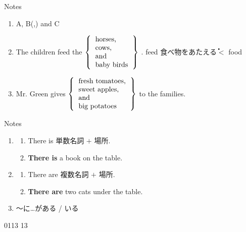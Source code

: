 \documentclass[aspectratio=169,xcolor={dvipsnames,table}]{beamer}
\newcommand{\myaudio}[1]{\href{#1}{\faVolumeUp}}
\begin{document}
\begin{frame}[plain,t]{Notes}
  \hypertarget{ABandC}{}
  \begin{enumerate}[<+->]
    \setlength{\itemsep}{5pt}
    \item A, B(,) and C
    \item The children feed the $\left\{
            \begin{tabular}{l}
              horses,    \\
              cows,      \\
              and        \\
              baby birds \\
            \end{tabular}\right\}$ .%
          \hfill{\scriptsize feed  食べ物をあたえる\.\.$<$ food}
    \item Mr. Green gives $\left\{
            \begin{tabular}{l}
              fresh tomatoes, \\
              sweet apples,   \\
              and             \\
              big potatoes    \\
            \end{tabular}\right\}$ to the families.\\
          \hfill{}
  \end{enumerate}

  \hfill\hyperlink{READING}{}

  \vspace{-90pt}

  \hspace{130pt}%
  \hspace{70pt}
\end{frame}
\begin{frame}[plain]{Notes}
  \hypertarget{THEREIS}{}
  \begin{enumerate}[<+->]
    \item \begin{enumerate}
            \item  There is 単数名詞 $+$ 場所.
            \item \textbf{There is} a book on the table.
          \end{enumerate}
    \item \begin{enumerate}
            \item There are 複数名詞 $+$ 場所.
            \item \textbf{There are} two cats under the table.
          \end{enumerate}
    \item ～に\ldots{}がある / いる
  \end{enumerate}

  \mbox{}\hfill{\tiny 0113}\,{\scriptsize \myaudio{./audio/005_singular_plural_13.mp3}}\,{\tiny 13}


  \hfill\hyperlink{READING}{}
\end{frame}
\end{document}
